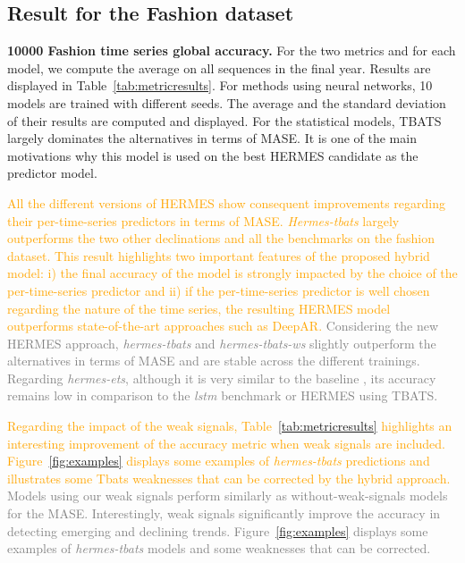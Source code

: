 \documentclass[10pt]{article} %
\begin{document}
\subsection{Result for the Fashion dataset}

\textbf{10000 Fashion time series global accuracy. }For the two metrics and for each model, we compute the average on all sequences in the final year. Results are displayed in Table~\ref{tab:metricresults}. For methods using neural networks, 10 models are trained  with different seeds. The average and the standard deviation of their results are computed and displayed. For the statistical models, TBATS largely dominates the alternatives in terms of MASE. It is one of the main motivations why this model is used on the best HERMES candidate as the predictor model. 

\textcolor{orange}{All the different versions of HERMES show consequent improvements regarding their per-time-series predictors in terms of MASE. \textit{Hermes-tbats} largely outperforms the two other declinations and all the benchmarks on the fashion dataset. This result highlights two important features of the proposed hybrid model: i) the final accuracy of the model is strongly impacted by the choice of the per-time-series predictor and ii) if the per-time-series predictor is well chosen regarding the nature of the time series, the resulting HERMES model outperforms state-of-the-art approaches such as DeepAR.}
\textcolor{gray}{Considering the new HERMES approach, \textit{hermes-tbats} and \textit{hermes-tbats-ws} slightly outperform the alternatives in terms of MASE and are stable across the different trainings. Regarding \textit{hermes-ets},   although it is very similar to the baseline \citet{smyl2020}, its accuracy remains low in comparison to the \textit{lstm} benchmark or HERMES using TBATS.}

\textcolor{orange}{Regarding the impact of the weak signals, Table~\ref{tab:metricresults} highlights an interesting improvement of the accuracy metric when weak signals are included. Figure~\ref{fig:examples} displays some examples of \textit{hermes-tbats} predictions and illustrates some Tbats weaknesses that can be corrected by the hybrid approach.}
\textcolor{gray}{
Models using our weak signals perform similarly as without-weak-signals models for the MASE.  Interestingly, weak signals significantly improve the accuracy in detecting emerging and declining trends. Figure~\ref{fig:examples} displays some examples of \textit{hermes-tbats} models and some weaknesses that can be corrected.}
\end{document}

